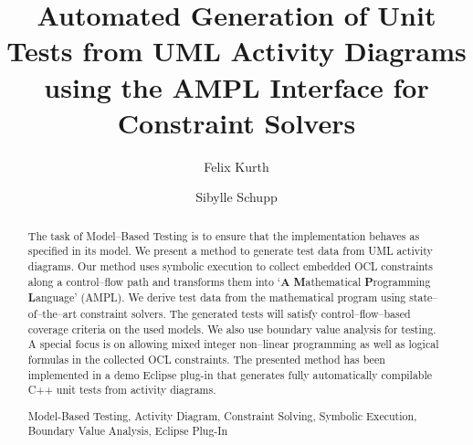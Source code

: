 \documentclass[runningheads,a4paper]{llncs}%
\newcommand{\keywords}[1]{\par\addvspace\baselineskip%
\noindent\keywordname\enspace\ignorespaces#1}%
\begin{document}
%
%
\mainmatter  %
%
\title{Automated Generation of Unit Tests from UML Activity Diagrams using the AMPL Interface for Constraint Solvers}%
%
%
%
%
%
\author{Felix Kurth%
\and Sibylle Schupp}%
%
%
%
%
%
%
%
\maketitle%
%
\begin{abstract}%
The task of Model--Based Testing is to ensure that the implementation behaves as specified in its model. We present a method to generate test data from UML activity diagrams. Our method uses symbolic execution to collect embedded OCL constraints along a control--flow path and transforms them into `\textbf{A} \textbf{M}athematical \textbf{P}rogramming \textbf{L}anguage' (AMPL). We derive test data from the mathematical program using state--of--the--art constraint solvers. The generated tests will satisfy control--flow--based coverage criteria on the used models. We also use boundary value analysis for testing. A special focus is on allowing mixed integer non--linear programming as well as logical formulas in the collected OCL constraints. The presented method has been implemented in a demo Eclipse plug-in that generates fully automatically compilable C++ unit tests from activity diagrams.%
\keywords{Model-Based Testing, Activity Diagram, Constraint Solving, Symbolic Execution, Boundary Value Analysis, Eclipse Plug-In}%
\end{abstract}%
\end{document}
